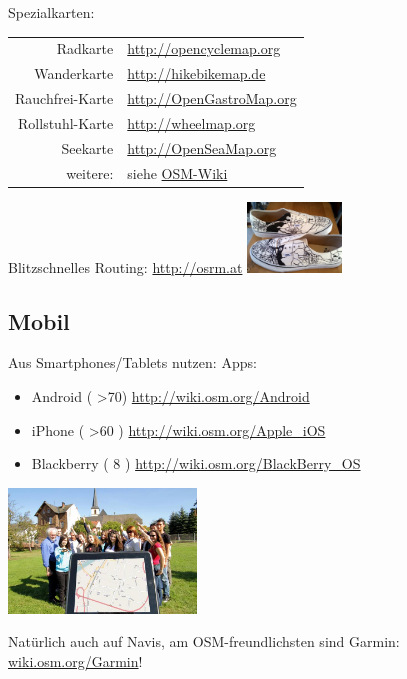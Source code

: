 \documentclass{beamer}
\begin{document}
\begin{frame}{Spezialkarten:}


  \begin{table}[htbp]
    \centering
    \begin{tabular}{r|l}
      Radkarte  &  \url{http://opencyclemap.org} \\
      Wanderkarte & \url{http://hikebikemap.de} \\
      Rauchfrei-Karte & \url{http://OpenGastroMap.org} \\
      Rollstuhl-Karte & \url{http://wheelmap.org} \\
      Seekarte & \url{http://OpenSeaMap.org} \\
\pause
      200 weitere: & siehe \href{http://wiki.openstreetmap.org/wiki/List\_of\_OSM\_based\_Services}{OSM-Wiki} \\
    \end{tabular}
  \end{table}

  Blitzschnelles Routing: \url{http://osrm.at} \hspace{1cm} \includegraphics[width=2.5cm]{shoes.jpg}

\end{frame}

\subsection{Mobil}
\begin{frame}{Aus Smartphones/Tablets nutzen:}
	Apps:
 
 \begin{itemize}
   \item  Android ( \textgreater 70) \url{http://wiki.osm.org/Android}
   \item  iPhone ( \textgreater 60 )  \url{http://wiki.osm.org/Apple\_iOS}
   \item  Blackberry ( 8 ) \url{http://wiki.osm.org/BlackBerry\_OS}
 \end{itemize}
 
 \begin{center}
 \includegraphics[width=5cm]{tablet.jpg}
 \end{center}

 Natürlich auch auf Navis, am OSM-freundlichsten sind Garmin: \href{http://wiki.osm.org/Garmin}{wiki.osm.org/Garmin}!

\end{frame}
\end{document}
